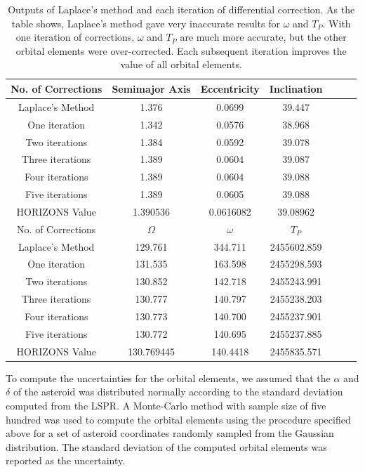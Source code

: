 \documentclass[12pt,journal,compsoc]{IEEEtran}
\begin{document}
\begin{table}[!t]
\centering
\begin{tabular}{|c|c|c|c|c|c|c|}
\hline
No. of Corrections & Semimajor Axis & Eccentricity & Inclination \\ \hline
Laplace's Method &1.376& 0.0699& 39.447 \\ \hline
One iteration &1.342& 0.0576& 38.968 \\ \hline
Two iterations &1.384& 0.0592& 39.078 \\ \hline
Three iterations &1.389& 0.0604& 39.087 \\ \hline
Four iterations &1.389& 0.0604& 39.088 \\ \hline
Five iterations &1.389& 0.0605& 39.088 \\ \hline
HORIZONS Value & 1.390536 & 0.0616082& 39.08962  \\ \hline \hline
No. of Corrections & $\Omega$ & $\omega$ & $T_P$\\ \hline
Laplace's Method & 129.761& 344.711& 2455602.859\\ \hline
One iteration & 131.535& 163.598& 2455298.593\\ \hline
Two iterations & 130.852& 142.718& 2455243.991\\ \hline
Three iterations & 130.777& 140.797& 2455238.203\\ \hline
Four iterations & 130.773& 140.700& 2455237.901\\ \hline
Five iterations & 130.772& 140.695& 2455237.885\\ \hline 
HORIZONS Value & 130.769445 & 140.4418 & 2455835.571 \\ \hline
\end{tabular}
\caption{\label{tab:serieslist} Outputs of Laplace's method and each iteration of differential correction. 
As the table shows, Laplace's method gave very inaccurate results for $\omega$ and $T_P$.
With one iteration of corrections, $\omega$ and $T_P$ are much more accurate, but the other orbital elements
were over-corrected. Each subsequent iteration improves the value of all orbital elements.}
\end{table}

To compute the uncertainties for the orbital elements, we assumed that the $\alpha$ and $\delta$ of the asteroid was distributed normally according to the standard deviation computed from the LSPR.
A Monte-Carlo method with sample size of five hundred was used to compute the orbital elements using the procedure specified above for a set of asteroid coordinates randomly sampled from the Gaussian distribution.
The standard deviation of the computed orbital elements was reported as the uncertainty.
\end{document}
